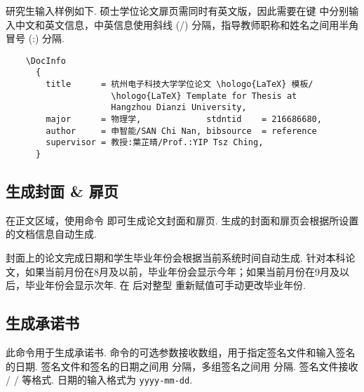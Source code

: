 研究生输入样例如下. 硕士学位论文扉页需同时有英文版，因此需要在键    中分别输入中文和英文信息，中英信息使用斜线 (\cmd/) 分隔，指导教师职称和姓名之间用半角冒号 (\cmd:) 分隔.

\begin{framed}
  \begin{verbatim}
    \DocInfo
      {
        title      = 杭州电子科技大学学位论文 \hologo{LaTeX} 模板/
                     \hologo{LaTeX} Template for Thesis at
                     Hangzhou Dianzi University,
        major      = 物理学,             stdntid    = 216686680,
        author     = 申智能/SAN Chi Nan, bibsource  = reference
        supervisor = 教授:葉芷晴/Prof.:YIP Tsz Ching,
      }
  \end{verbatim}
\end{framed}

\subsection{生成封面 \& 扉页}

在正文区域，使用命令  即可生成论文封面和扉页. 生成的封面和扉页会根据所设置的文档信息自动生成.

封面上的论文完成日期和学生毕业年份会根据当前系统时间自动生成.
针对本科论文，如果当前月份在8月及以前，毕业年份会显示今年；如果当前月份在9月及以后，毕业年份会显示次年. 在  后对整型  重新赋值可手动更改毕业年份.

\begin{syntax}
      
\end{syntax}

\subsection{生成承诺书}

\begin{function}{\commitment}
  \begin{syntax}
     
  \end{syntax}

  此命令用于生成承诺书. 命令的可选参数接收数组，用于指定签名文件和输入签名的日期. 签名文件和签名的日期之间用 \cmd{/} 分隔，多组签名之间用 \cmd{,} 分隔. 签名文件接收  /  /  等格式. 日期的输入格式为 \texttt{yyyy-mm-dd}.
\end{function}

